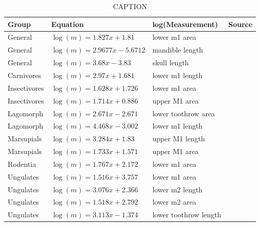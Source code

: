 \documentclass{article}
\begin{document}
\clearpage

\begin{table}[t!]
  \centering
  \begin{tabular}{l | l | l | l}
    Group & Equation & log(Measurement) & Source \\
    \hline
    General & \(\log(m) = 1.827x + 1.81\) & lower m1 area &  \cite{Legendre1986} \\
    General & \(\log(m) = 2.9677x - 5.6712\) & mandible length & \cite{Foster2009a} \\
    General & \(\log(m) = 3.68x - 3.83\) & skull length & \cite{Luo2001} \\
    Carnivores & \(\log(m) = 2.97x + 1.681\) & lower m1 length & \cite{VanValkenburgh1990} \\
    Insectivores & \(\log(m) = 1.628x + 1.726\) & lower m1 area & \cite{Bloch1998} \\
    Insectivores & \(\log(m) = 1.714x + 0.886\) & upper M1 area & \cite{Bloch1998} \\
    Lagomorph & \(\log(m) = 2.671x - 2.671\) & lower toothrow area & \cite{Tomiya2013} \\
    Lagomorph & \(\log(m) = 4.468x - 3.002\) & lower m1 length & \cite{Tomiya2013} \\
    Marsupials & \(\log(m) = 3.284x + 1.83\) & upper M1 length & \cite{Gordon2003} \\
    Marsupials & \(\log(m) = 1.733x + 1.571\) & upper M1 area & \cite{Gordon2003} \\
    Rodentia & \(\log(m) = 1.767x + 2.172\) & lower m1 area & \cite{Legendre1986} \\
    Ungulates & \(\log(m) = 1.516x + 3.757\) & lower m1 area & \cite{Mendoza2006} \\
    Ungulates & \(\log(m) = 3.076x + 2.366\) & lower m2 length & \cite{Mendoza2006} \\
    Ungulates & \(\log(m) = 1.518x + 2.792\) & lower m2 area & \cite{Mendoza2006} \\
    Ungulates & \(\log(m) = 3.113x - 1.374\) & lower toothrow length & \cite{Mendoza2006} \\
    \hline
  \end{tabular}
  \caption{CAPTION}
  \label{tab:mass_est}
\end{table}

\clearpage

\end{document}
